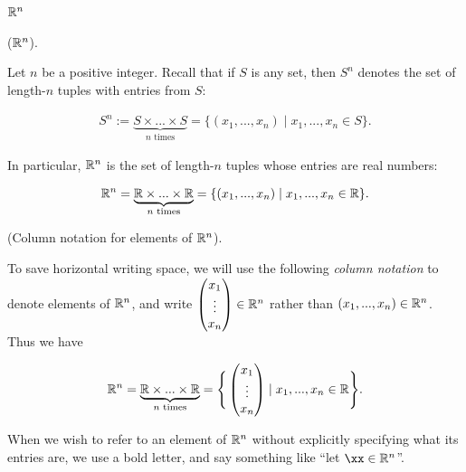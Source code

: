 \subsection*{$\mathbb{R}^n$}

\begin{defn}
    ($\mathbb{R}^n$).
    
    Let $n$ be a positive integer. Recall that if $S$ is any set, then $S^n$ denotes the set of length-$n$ tuples with entries from $S$:
    
    \begin{align*}
        S^n := \underbrace{S \times ... \times S}_{\text{$n$ times}} = \{(x_1, ..., x_n) \mid x_1, ..., x_n \in S\}.
    \end{align*}
    
    In particular, $\mathbb{R}^n$ is the set of length-$n$ tuples whose entries are real numbers: 
    
    \begin{align*}
        \mathbb{R}^n = \underbrace{\mathbb{R} \times ... \times \mathbb{R}}_{\text{$n$ times}} = \{(x_1, ..., x_n) \mid x_1, ..., x_n \in \mathbb{R}\}.
    \end{align*}
\end{defn}

\begin{defn}
    (Column notation for elements of $\mathbb{R}^n$).
    
    To save horizontal writing space, we will use the following \textit{column notation} to denote elements of $\mathbb{R}^n$, and write $\begin{pmatrix} x_1 \\ \vdots \\ x_n \end{pmatrix} \in \mathbb{R}^n$ rather than $(x_1, ..., x_n) \in \mathbb{R}^n$. Thus we have
    
    \begin{align*}
        \mathbb{R}^n = \underbrace{\mathbb{R} \times ... \times \mathbb{R}}_{\text{$n$ times}} = \Bigg\{ \begin{pmatrix} x_1 \\ \vdots \\ x_n \end{pmatrix} \mid x_1, ..., x_n \in \mathbb{R} \Bigg\}.
    \end{align*}
    
    When we wish to refer to an element of $\mathbb{R}^n$ without explicitly specifying what its entries are, we use a bold letter, and say something like ``let $\xx \in \R^n$''.
\end{defn}

